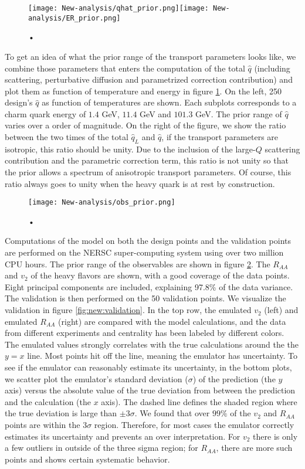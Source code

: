 \begin{figure}
\centering
\texttt{[image: New-analysis/qhat\_prior.png]}\texttt{[image: New-analysis/ER\_prior.png]}
\caption{•}
\label{fig:new:design-qhat}
\end{figure}

To get an idea of what the prior range of the transport parameters looks like, we combine those parameters that enters the computation of the total $\hat{q}$ (including scattering, perturbative diffusion and parametrized correction contribution) and plot them as function of temperature and energy in figure \ref{fig:new:design-qhat}. 
On the left, 250 design's $\hat{q}$ as function of temperatures are shown. Each subplots corresponds to a charm quark energy of $1.4$ GeV, $11.4$ GeV and $101.3$ GeV.
The prior range of $\hat{q}$ varies over a order of magnitude.
On the right of the figure, we show the ratio between the two times of the total $\hat{q}_L$ and $\hat{q}$, if the transport parameters are isotropic, this ratio should be unity.
Due to the inclusion of the large-$Q$ scattering contribution and the parametric correction term, this ratio is not unity so that the prior allows a spectrum of anisotropic transport parameters.
Of course, this ratio always goes to unity when the heavy quark is at rest by construction.

\begin{figure}
\centering
\texttt{[image: New-analysis/obs\_prior.png]}
\caption{•}
\label{fig:new:obs_prior}
\end{figure}

Computations of the model on both the design points and the validation points are performed on the NERSC super-computing system using over two million CPU hours.
The prior range of the observables are shown in figure \ref{fig:new:obs_prior}.
The $R_{AA}$ and $v_2$ of the heavy flavors are shown, with a good coverage of the data points.
Eight principal components are included, explaining 97.8\% of the data variance.
The validation is then performed on the 50 validation points.
We visualize the validation in figure \ref{fig:new:validation}.
In the top row, the emulated $v_2$ (left) and emulated $R_{AA}$ (right) are compared with the model calculations, and the data from different experiments and centrality has been labeled by different colors.
The emulated values strongly correlates with the true calculations around the the $y=x$ line.
Most points hit off the line, meaning the emulator has uncertainty.
To see if the emulator can reasonably estimate its uncertainty, in the bottom plots, we scatter plot the emulator's standard deviation ($\sigma$) of the prediction (the $y$ axis) versus the absolute value of the true deviation from between the prediction and the calculation (the $x$ axis).
The dashed line defines the shaded region where the true deviation is large than $\pm 3\sigma$.
We found that over $99\%$ of the $v_2$ and $R_{AA}$ points are within the $3\sigma$ region.
Therefore, for most cases the emulator correctly estimates its uncertainty and prevents an over interpretation.
For $v_2$ there is only a few outliers in outside of the three sigma region; for $R_{AA}$, there are more such points and shows certain systematic behavior.


